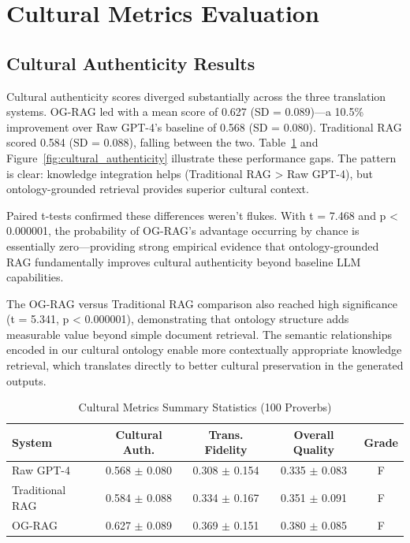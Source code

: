\section{Cultural Metrics Evaluation}
\label{sec:cultural_metrics}

\subsection{Cultural Authenticity Results}
\label{sec:cultural_authenticity_results}

Cultural authenticity scores diverged substantially across the three translation systems. OG-RAG led with a mean score of 0.627 (SD = 0.089)—a 10.5\% improvement over Raw GPT-4's baseline of 0.568 (SD = 0.080). Traditional RAG scored 0.584 (SD = 0.088), falling between the two. Table~\ref{tab:cultural_metrics} and Figure~\ref{fig:cultural_authenticity} illustrate these performance gaps. The pattern is clear: knowledge integration helps (Traditional RAG > Raw GPT-4), but ontology-grounded retrieval provides superior cultural context.

Paired t-tests confirmed these differences weren't flukes. With t = 7.468 and p < 0.000001, the probability of OG-RAG's advantage occurring by chance is essentially zero—providing strong empirical evidence that ontology-grounded RAG fundamentally improves cultural authenticity beyond baseline LLM capabilities.

The OG-RAG versus Traditional RAG comparison also reached high significance (t = 5.341, p < 0.000001), demonstrating that ontology structure adds measurable value beyond simple document retrieval. The semantic relationships encoded in our cultural ontology enable more contextually appropriate knowledge retrieval, which translates directly to better cultural preservation in the generated outputs.

\begin{table}[htbp]
\centering
\caption{Cultural Metrics Summary Statistics (100 Proverbs)}
\label{tab:cultural_metrics}
\begin{tabular}{lcccc}
\hline
\textbf{System} & \textbf{Cultural Auth.} & \textbf{Trans. Fidelity} & \textbf{Overall Quality} & \textbf{Grade} \\
\hline
Raw GPT-4 & 0.568 $\pm$ 0.080 & 0.308 $\pm$ 0.154 & 0.335 $\pm$ 0.083 & F \\
Traditional RAG & 0.584 $\pm$ 0.088 & 0.334 $\pm$ 0.167 & 0.351 $\pm$ 0.091 & F \\
OG-RAG & 0.627 $\pm$ 0.089 & 0.369 $\pm$ 0.151 & 0.380 $\pm$ 0.085 & F \\
\hline
\end{tabular}
\end{table}

